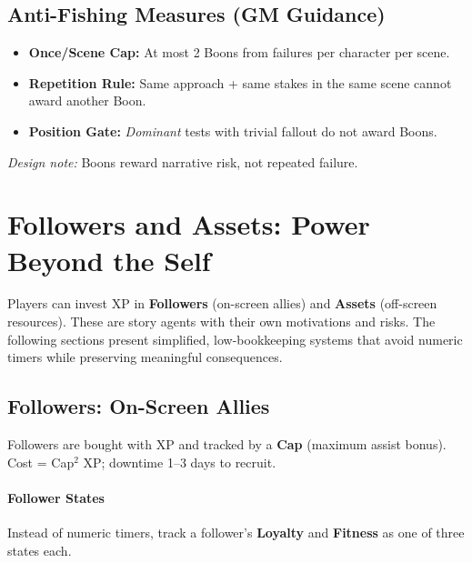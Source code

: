 \subsection{Anti-Fishing Measures (GM Guidance)}
\label{subsec:boons-anti-fishing}

\begin{itemize}
  \item \textbf{Once/Scene Cap:} At most 2 Boons from failures per character per scene.
  \item \textbf{Repetition Rule:} Same approach + same stakes in the same scene cannot award another Boon.
  \item \textbf{Position Gate:} \textit{Dominant} tests with trivial fallout do not award Boons.
\end{itemize}
\emph{Design note:} Boons reward narrative risk, not repeated failure.

\section{Followers and Assets: Power Beyond the Self}
\label{sec:followers-assets-gm}

Players can invest XP in \textbf{Followers} (on-screen allies) and \textbf{Assets} (off-screen resources). These are story agents with their own motivations and risks. The following sections present simplified, low-bookkeeping systems that avoid numeric timers while preserving meaningful consequences.

\subsection{Followers: On-Screen Allies}
\label{subsec:followers-gm}

Followers are bought with XP and tracked by a \textbf{Cap} (maximum assist bonus). Cost = Cap\(^2\) XP; downtime 1--3 days to recruit.

\paragraph{Follower States}
Instead of numeric timers, track a follower's \textbf{Loyalty} and \textbf{Fitness} as one of three states each.

